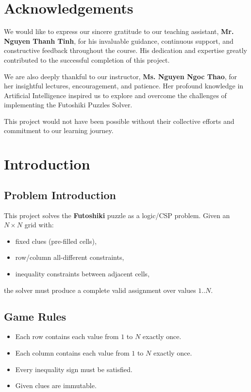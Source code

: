\documentclass[12pt,a4paper]{article}
\begin{document}
\tableofcontents
\newpage

\section*{Acknowledgements}

We would like to express our sincere gratitude to our teaching assistant, \textbf{Mr. Nguyen Thanh Tinh}, for his invaluable guidance, continuous support, and constructive feedback throughout the course. His dedication and expertise greatly contributed to the successful completion of this project.

We are also deeply thankful to our instructor, \textbf{Ms. Nguyen Ngoc Thao}, for her insightful lectures, encouragement, and patience. Her profound knowledge in Artificial Intelligence inspired us to explore and overcome the challenges of implementing the Futoshiki Puzzles Solver.

This project would not have been possible without their collective efforts and commitment to our learning journey.
\newpage

\section{Introduction}

\subsection{Problem Introduction}
This project solves the \textbf{Futoshiki} puzzle as a logic/CSP problem.  
Given an $N \times N$ grid with:
\begin{itemize}
    \item fixed clues (pre-filled cells),
    \item row/column all-different constraints,
    \item inequality constraints between adjacent cells,
\end{itemize}
the solver must produce a complete valid assignment over values $1..N$.

\subsection{Game Rules}
\begin{itemize}
    \item Each row contains each value from $1$ to $N$ exactly once.
    \item Each column contains each value from $1$ to $N$ exactly once.
    \item Every inequality sign must be satisfied.
    \item Given clues are immutable.
\end{itemize}
\end{document}
